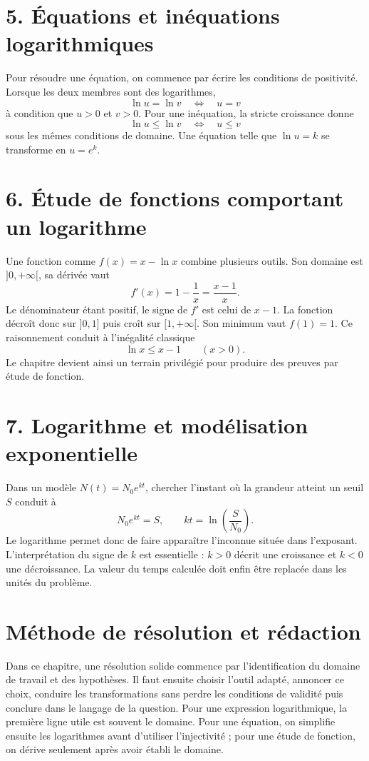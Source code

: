 
\section{5. Équations et inéquations logarithmiques}
Pour résoudre une équation, on commence par écrire les conditions de positivité. Lorsque les deux membres sont des logarithmes,
\[
\ln u=\ln v\quad\Longleftrightarrow\quad u=v
\]
à condition que $u>0$ et $v>0$. Pour une inéquation, la stricte croissance donne
\[
\ln u\leq \ln v\quad\Longleftrightarrow\quad u\leq v
\]
sous les mêmes conditions de domaine. Une équation telle que $\ln u=k$ se transforme en $u=e^k$.

\section{6. Étude de fonctions comportant un logarithme}
Une fonction comme $f(x)=x-\ln x$ combine plusieurs outils. Son domaine est $]0,+\infty[$, sa dérivée vaut
\[
f'(x)=1-\frac1x=\frac{x-1}{x}.
\]
Le dénominateur étant positif, le signe de $f'$ est celui de $x-1$. La fonction décroît donc sur $]0,1]$ puis croît sur $[1,+\infty[$. Son minimum vaut $f(1)=1$. Ce raisonnement conduit à l’inégalité classique
\[
\ln x\leq x-1\qquad (x>0).
\]
Le chapitre devient ainsi un terrain privilégié pour produire des preuves par étude de fonction.

\section{7. Logarithme et modélisation exponentielle}
Dans un modèle $N(t)=N_0e^{kt}$, chercher l’instant où la grandeur atteint un seuil $S$ conduit à
\[
N_0e^{kt}=S,\qquad kt=\ln\!\left(\frac{S}{N_0}\right).
\]
Le logarithme permet donc de faire apparaître l’inconnue située dans l’exposant. L’interprétation du signe de $k$ est essentielle : $k>0$ décrit une croissance et $k<0$ une décroissance. La valeur du temps calculée doit enfin être replacée dans les unités du problème.

\section{Méthode de résolution et rédaction}
Dans ce chapitre, une résolution solide commence par l’identification du domaine de travail et des hypothèses. Il faut ensuite choisir l’outil adapté, annoncer ce choix, conduire les transformations sans perdre les conditions de validité puis conclure dans le langage de la question. Pour une expression logarithmique, la première ligne utile est souvent le domaine. Pour une équation, on simplifie ensuite les logarithmes avant d’utiliser l’injectivité ; pour une étude de fonction, on dérive seulement après avoir établi le domaine.

